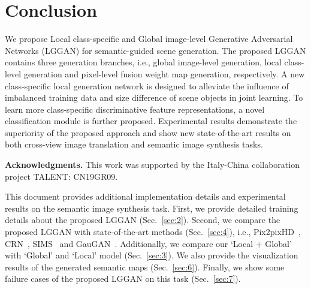 \documentclass[10pt,twocolumn,letterpaper]{article}
\begin{document}
 \section{Conclusion}
We propose Local class-specific and Global image-level Generative Adversarial Networks (LGGAN) for semantic-guided scene generation. 
The proposed LGGAN contains three generation branches, i.e., global image-level generation, local class-level generation and pixel-level fusion weight map generation, respectively.
A new class-specific local generation network is designed to alleviate the influence of imbalanced training data and size difference of scene objects in joint learning. 
To learn more class-specific discriminative feature representations, a novel classification module is further proposed. 
Experimental results demonstrate the superiority of the proposed approach and show new state-of-the-art results on both cross-view image translation and semantic image synthesis tasks.


\noindent \textbf{Acknowledgments.} This work was supported by the Italy-China collaboration project
TALENT: CN19GR09. 
\clearpage
{\small
	
	
}

\clearpage
This document  provides additional implementation details and experimental results on the semantic image synthesis task. 
First, we provide detailed
training details about the proposed LGGAN (Sec.~\ref{sec:2}). 
Second, we compare the proposed LGGAN with  state-of-the-art methods (Sec.~\ref{sec:4}), i.e., Pix2pixHD~\cite{wang2018high}, CRN~\cite{chen2017photographic}, SIMS~\cite{qi2018semi} and GauGAN~\cite{park2019semantic}.
Additionally, we compare our `Local + Global'
with `Global' and `Local' model (Sec.~\ref{sec:3}). 
We also provide the visualization
results of the generated semantic maps (Sec.~\ref{sec:6}). 
Finally, we show some failure cases of the proposed  LGGAN on this task (Sec.~\ref{sec:7}). 



	






	
	
\end{document}

